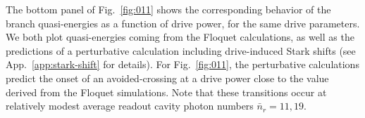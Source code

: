 \documentclass[%
reprint,
superscriptaddress,
 amsmath,amssymb,
 aps,
 prx,
longbibliography,
floatfix,
]{revtex4-2}
\begin{document}
The bottom panel of Fig.~\ref{fig:011} shows the corresponding behavior of the branch quasi-energies as a function of drive power, for the same drive parameters.  We both plot quasi-energies coming from the Floquet calculations, as well as the predictions of a perturbative calculation including drive-induced Stark shifts (see App.~\ref{app:stark-shift} for details). For Fig.~\ref{fig:011}, the perturbative calculations predict the onset of an avoided-crossing at a drive power close to the value derived from the Floquet simulations.%
Note that these transitions occur at relatively modest average readout cavity photon numbers $\bar n_r=11,19$. 
\end{document}
